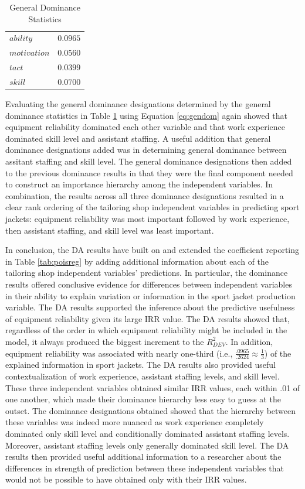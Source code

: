 \documentclass[man]{apa7}
\begin{document}
	\begin{table}[h!]
		\centering
		\caption{\centering General Dominance Statistics}
		\begin{tabular}{l|r}
			\hline 
			$ability$ & $0.0965$ \\ 
			$motivation$ & $0.0560$ \\ 
			$tact$ & $0.0399$ \\ 
			$skill$ & $0.0700$ \\ 
			\hline 
		\end{tabular}
		\label{tab:gen}
	\end{table}

	Evaluating the general dominance designations determined by the general dominance statistics in Table \ref{tab:gen} using Equation \ref{eq:gendom} again showed that equipment reliability dominated each other variable and that work experience dominated skill level and assistant staffing. 
	A useful addition that general dominance designations added was in determining general dominance between assitant staffing and skill level.
	The general dominance designations then added to the previous dominance results in that they were the final component needed to construct an importance hierarchy among the independent variables.
	In combination, the results across all three dominance designations resulted in a clear rank ordering of the tailoring shop independent variables in predicting sport jackets: equipment reliability was most important followed by work experience, then assistant staffing, and skill level was least important.
	
	In conclusion, the DA results have built on and extended the coefficient reporting in Table \ref{tab:poisreg} by adding additional information about each of the tailoring shop independent variables' predictions.
	In particular, the dominance results offered conclusive evidence for differences between independent variables in their ability to explain variation or information in the sport jacket production variable. 
	The DA results supported the inference about the predictive usefulness of equipment reliability given its large IRR value. 
	The DA results showed that, regardless of the order in which equipment reliability might be included in the model, it always produced the biggest increment to the $R^2_{DEV}$. 
	In addition, equipment reliability was associated with nearly one-third (i.e., $\frac{.0965}{.2624} \approx \frac{1}{3}$) of the explained information in sport jackets.
	The DA results also provided useful contextualization of work experience, assistant staffing levels, and skill level.
	These three independent variables obtained similar IRR values, each within .01 of one another, which made their dominance hierarchy less easy to guess at the outset.
	The dominance designations obtained showed that the hierarchy between these variables was indeed more nuanced as work experience completely dominated only skill level and conditionally dominated assistant staffing levels. 
	Moreover, assistant staffing levels only generally dominated skill level.
	The DA results then provided useful additional information to a researcher about the differences in strength of prediction between these independent variables that would not be possible to have obtained only with their IRR values.
	
\end{document}
